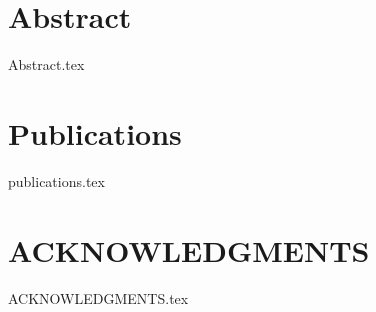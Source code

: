 \documentclass[ oneside,openright,titlepage,numbers=noenddot,headinclude,%
                footinclude=true,cleardoublepage=empty,abstractoff, %
                BCOR=5mm,paper=a4,fontsize=11pt,%
                 ngerman,american,%
                ]{scrreprt}
\begin{document}
\tableofcontents
\newpage
\begingroup 
    \let\clearpage\relax
    \let\cleardoublepage\relax
    \let\cleardoublepage\relax

    
    \listoffigures
    \vspace*{8ex}

    \newpage
    \listoftables
    \vspace*{8ex}
    


\newpage
\chapter{Abstract}
{Abstract.tex}

\newpage
\chapter{Publications}
{publications.tex}

\newpage
\chapter{ACKNOWLEDGMENTS}
{ACKNOWLEDGMENTS.tex}
\end{document}
